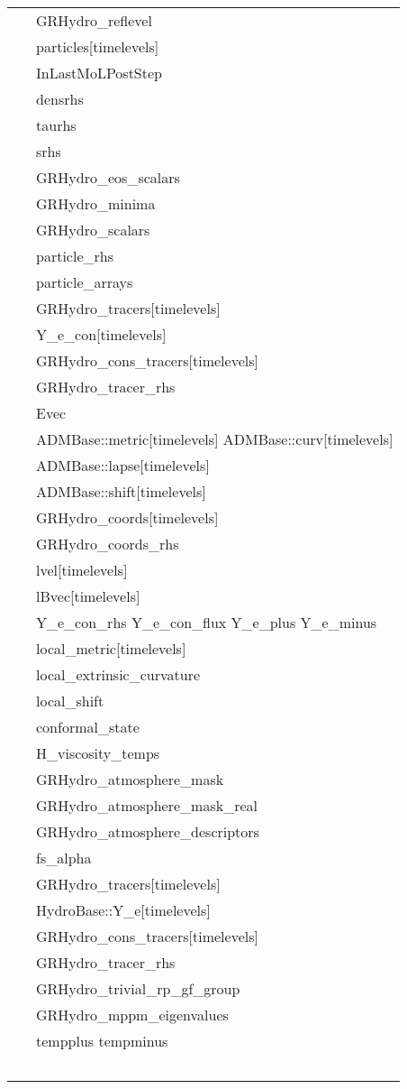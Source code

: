 \begin{tabular*}{160mm}{ll}
~ &  GRHydro\_reflevel\\ 
~ &  particles[timelevels]\\ 
~ &  InLastMoLPostStep\\ 
~ &  densrhs\\ 
~ &  taurhs\\ 
~ &  srhs\\ 
~ &  GRHydro\_eos\_scalars\\ 
~ &  GRHydro\_minima\\ 
~ &  GRHydro\_scalars\\ 
~ &  particle\_rhs\\ 
~ &  particle\_arrays\\ 
~ &  GRHydro\_tracers[timelevels]\\ 
~ &  Y\_e\_con[timelevels]\\ 
~ &  GRHydro\_cons\_tracers[timelevels]\\ 
~ &  GRHydro\_tracer\_rhs\\ 
~ &  Evec\\ 
~ &  ADMBase::metric[timelevels] ADMBase::curv[timelevels]\\ 
~ &  ADMBase::lapse[timelevels]\\ 
~ &  ADMBase::shift[timelevels]\\ 
~ &  GRHydro\_coords[timelevels]\\ 
~ &  GRHydro\_coords\_rhs\\ 
~ &  lvel[timelevels]\\ 
~ &  lBvec[timelevels]\\ 
~ &  Y\_e\_con\_rhs Y\_e\_con\_flux Y\_e\_plus Y\_e\_minus\\ 
~ &  local\_metric[timelevels]\\ 
~ &  local\_extrinsic\_curvature\\ 
~ &  local\_shift\\ 
~ &  conformal\_state\\ 
~ &  H\_viscosity\_temps\\ 
~ &  GRHydro\_atmosphere\_mask\\ 
~ &  GRHydro\_atmosphere\_mask\_real\\ 
~ &  GRHydro\_atmosphere\_descriptors\\ 
~ &  fs\_alpha\\ 
~ &  GRHydro\_tracers[timelevels]\\ 
~ &  HydroBase::Y\_e[timelevels]\\ 
~ &  GRHydro\_cons\_tracers[timelevels]\\ 
~ &  GRHydro\_tracer\_rhs\\ 
~ &  GRHydro\_trivial\_rp\_gf\_group\\ 
~ &  GRHydro\_mppm\_eigenvalues\\ 
~ &  tempplus tempminus\\ 
~ & ~\\ 
\end{tabular*} 


